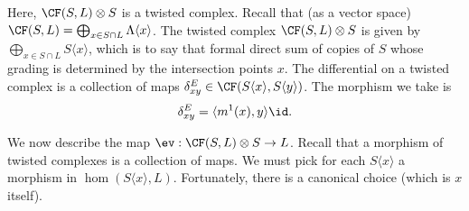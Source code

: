 
    Here, $\CF(S, L)\otimes S$ is a twisted complex. Recall that (as a vector space) $\CF(S, L)=\bigoplus_{x\in S\cap L} \Lambda\langle x \rangle$. 
    The twisted complex $\CF(S, L)\otimes S$ is given by $\bigoplus_{x\in S\cap L} S\langle x \rangle$, which is to say that formal direct sum of copies of $S$ whose grading is determined by the intersection points $x$.
    The differential on a twisted complex is a collection of maps $\delta_{xy}^E\in \CF(S\langle x \rangle, S\langle y \rangle)$. The morphism we take is 
    \[\delta_{xy}^E= \langle m^1(x), y\rangle \id.\]
    
    We now describe the map $\ev: \CF(S, L)\otimes S\to L$. Recall that a morphism of twisted complexes is a collection of maps. We must pick for each $S\langle x \rangle$ a morphism in $\hom(S\langle x \rangle , L)$. Fortunately, there is a canonical choice (which is $x$ itself). 

